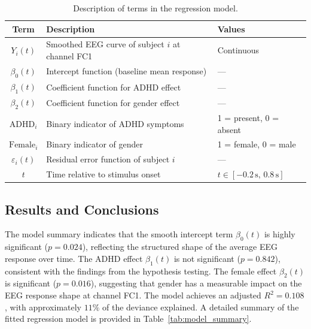 \documentclass[twoside,11pt]{article}
\begin{document}
\begin{table}[ht]
  \centering
  \begin{tabular}{cll}
    \toprule
    \textbf{Term} & \textbf{Description} & \textbf{Values} \\
    \midrule

    $Y_i(t)$
    & Smoothed EEG curve of subject $i$ at channel FC1
    & Continuous \\

    $\beta_0(t)$
    & Intercept function (baseline mean response)
    & --- \\

    $\beta_1(t)$
    & Coefficient function for ADHD effect
    & --- \\

    $\beta_2(t)$
    & Coefficient function for gender effect
    & --- \\

    $\text{ADHD}_i$
    & Binary indicator of ADHD symptoms
    & 1 = present, 0 = absent \\

    $\text{Female}_i$
    & Binary indicator of gender
    & 1 = female, 0 = male \\

    $\varepsilon_i(t)$
    & Residual error function of subject $i$
    & --- \\

    $t$
    & Time relative to stimulus onset
    & $t \in [-0.2\,\mathrm{s},\, 0.8\,\mathrm{s}]$ \\

    \bottomrule
  \end{tabular}
  \caption{Description of terms in the regression model.}
  \label{tab:model_terms}
\end{table}

\subsection{Results and Conclusions}

The model summary indicates that the smooth intercept term $\beta_0(t)$ is highly significant ($p =
0.024$), reflecting the structured shape of the average EEG response over time. The ADHD effect
$\beta_1(t)$ is not significant ($p = 0.842$), consistent with the findings from the hypothesis
testing. The female effect $\beta_2(t)$ is significant ($p = 0.016$), suggesting that gender has a
measurable impact on the EEG response shape at channel FC1. The model achieves an adjusted $R^2 =
0.108$, with approximately $11\%$ of the deviance explained. A detailed summary of the fitted
regression model is provided in Table~\ref{tab:model_summary}.
\end{document}
